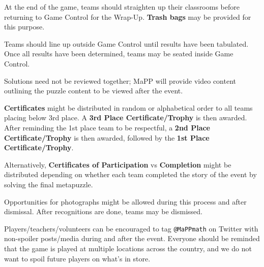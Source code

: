 
At the end of the game, teams should straighten up their classrooms before
returning to Game Control for the Wrap-Up. \textbf{Trash bags} may be
provided for this purpose.

Teams should line up outside Game Control until results have been tabulated.
Once all results have been determined, teams may be seated inside Game Control.

Solutions need not be reviewed together; MaPP will provide video
content outlining the puzzle content to be viewed after the event.

\textbf{Certificates} might be distributed in
random or alphabetical order to all teams placing
below 3rd place.
A \textbf{3rd Place Certificate/Trophy} is then awarded.
After reminding the 1st place team to be respectful, a
\textbf{2nd Place Certificate/Trophy} is then awarded, followed by the
\textbf{1st Place Certificate/Trophy}.

Alternatively, \textbf{Certificates of Participation} vs \textbf{Completion}
might be distributed depending on whether each team completed the
story of the event by solving the final metapuzzle.

Opportunities for photographs might
be allowed during this process and after dismissal.
After recognitions are done, teams may be dismissed.


Players/teachers/volunteers can be encouraged to tag \texttt{@MaPPmath}
on Twitter with non-spoiler posts/media during
and after the event. Everyone should be reminded that the game is played
at multiple locations across the country, and we do not want to spoil
future players on what's in store.

